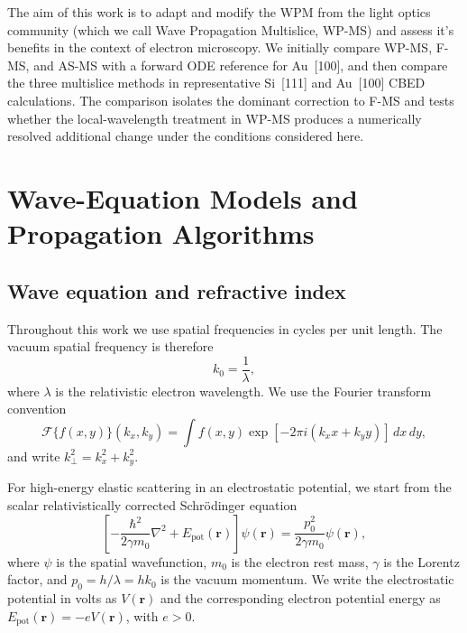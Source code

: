 \documentclass[preprint,12pt,number]{elsarticle}
\begin{document}
The aim of this work is to adapt and modify the WPM from the light optics community (which we call Wave Propagation Multislice, WP-MS) 
and assess it's benefits in the context of electron microscopy.
We initially compare WP-MS, F-MS, and AS-MS with a forward ODE reference for Au~[100], and
then compare the three multislice methods in representative Si~[111] and
Au~[100] CBED calculations. The comparison isolates the dominant correction to
F-MS and tests whether the local-wavelength treatment in WP-MS produces a
numerically resolved additional change under the conditions considered here.

\section{Wave-Equation Models and Propagation Algorithms}
\label{sec:propagation_models}

\subsection{Wave equation and refractive index}
\label{sec:wave_equation_refractive_index}

Throughout this work we use spatial frequencies in cycles per unit length. The vacuum spatial
frequency is therefore
\begin{equation}
k_0=\frac{1}{\lambda},
\label{eq:spatial_frequency_convention}
\end{equation}
where $\lambda$ is the relativistic electron wavelength. We use the
Fourier transform convention
\begin{equation}
\mathcal F\{f(x,y)\}(k_x,k_y)
=
\int f(x,y)
\exp\left[-2\pi i(k_x x+k_y y)\right]\,dx\,dy,
\label{eq:fourier_convention}
\end{equation}
and write $k_\perp^2=k_x^2+k_y^2$.

For high-energy elastic scattering in an electrostatic potential, we start from
the scalar relativistically corrected Schr\"odinger
equation~\cite{fujiwara1961relativistic,kirkland2010advanced}
\begin{equation}
\left[
-\frac{\hbar^2}{2\gamma m_0}\nabla^2
+
E_{\mathrm{pot}}(\mathbf r)
\right]\psi(\mathbf r)
=
\frac{p_0^2}{2\gamma m_0}\psi(\mathbf r),
\label{eq:relativistic_schrodinger_intro}
\end{equation}
where $\psi$ is the spatial wavefunction, $m_0$ is the electron rest mass,
$\gamma$ is the Lorentz factor, and $p_0=h/\lambda=h k_0$ is the vacuum
momentum. We write the electrostatic potential in volts as $V(\mathbf r)$ and
the corresponding electron potential energy as
$E_{\mathrm{pot}}(\mathbf r)=-eV(\mathbf r)$, with $e>0$.
\end{document}
